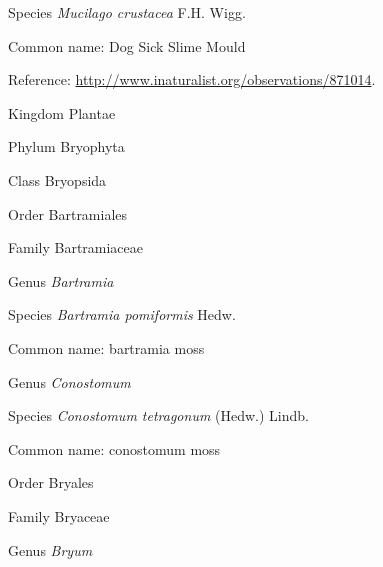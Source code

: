 \documentclass[9pt, article]{memoir}
\begin{document}
\begin{multicols}{2}
\vspace{6pt}\noindent\hspace{36pt}Species \textit{Mucilago crustacea} F.H. Wigg.


Common name: Dog Sick Slime Mould

Reference: 
\url{http://www.inaturalist.org/observations/871014}.

\vspace{6pt}\noindent\hspace{0pt}Kingdom Plantae


\vspace{6pt}\noindent\hspace{6pt}Phylum Bryophyta


\vspace{6pt}\noindent\hspace{12pt}Class Bryopsida


\vspace{6pt}\noindent\hspace{18pt}Order Bartramiales


\vspace{6pt}\noindent\hspace{24pt}Family Bartramiaceae


\vspace{6pt}\noindent\hspace{30pt}Genus \textit{Bartramia}


\vspace{6pt}\noindent\hspace{36pt}Species \textit{Bartramia pomiformis} Hedw.


Common name: bartramia moss

\vspace{6pt}\noindent\hspace{30pt}Genus \textit{Conostomum}


\vspace{6pt}\noindent\hspace{36pt}Species \textit{Conostomum tetragonum} (Hedw.) Lindb.


Common name: conostomum moss

\vspace{6pt}\noindent\hspace{18pt}Order Bryales


\vspace{6pt}\noindent\hspace{24pt}Family Bryaceae


\vspace{6pt}\noindent\hspace{30pt}Genus \textit{Bryum}



\end{multicols}
\end{document}

